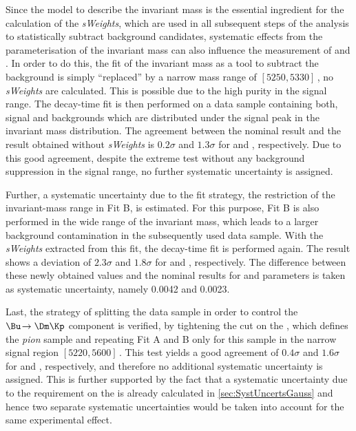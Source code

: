 Since the model to describe the invariant mass is the essential ingredient for the calculation of the \emph{sWeights}, which are used in all subsequent steps of the analysis to statistically subtract background candidates, systematic effects from the parameterisation of the invariant mass can also influence the measurement of \Sf and \Sfbar.
In order to do this, the fit of the invariant mass as a tool to subtract the background is simply \enquote{replaced} by a narrow mass range of $[5250,5330]\,$\si[per-mode=symbol]{\MeVcc}, \ie no \emph{sWeights} are calculated.
This is possible due to the high purity in the signal range.
The decay-time fit is then performed on a data sample containing both, signal and backgrounds which are distributed under the signal peak in the invariant mass distribution.
The agreement between the nominal result and the result obtained without \emph{sWeights} is $0.2\sigma$ and $1.3\sigma$ for \Sf and \Sfbar, respectively.
Due to this good agreement, despite the extreme test without any background suppression in the signal range, no further systematic uncertainty is assigned.

Further, a systematic uncertainty due to the fit strategy, \ie the restriction of the invariant-mass range in Fit B, is estimated.
For this purpose, Fit B is also performed in the wide range of the invariant mass, which leads to a larger background contamination in the subsequently used data sample.
With the \emph{sWeights} extracted from this fit, the decay-time fit is performed again.
The result shows a deviation of $2.3\sigma$ and $1.8\sigma$ for \Sf and \Sfbar, respectively.
The difference between these newly obtained values and the nominal results for \Sf and \Sfbar parameters is taken as systematic uncertainty, namely \num{0.0042} and \num{0.0023}.

Last, the strategy of splitting the data sample in order to control the $\Bu\!\to\Dm\Kp$ component is verified, by tightening the cut on the \dllkpi, which defines the \emph{pion} sample and repeating Fit A and B only for this sample in the narrow signal region $[5220, 5600]\,$\si[per-mode=symbol]{\MeVcc}.
This test yields a good agreement of $0.4\sigma$ and $1.6\sigma$ for \Sf and \Sfbar, respectively, and therefore no additional systematic uncertainty is assigned.
This is further supported by the fact that a systematic uncertainty due to the requirement on the \dllkpi is already calculated in \cref{sec:SystUncertsGauss} and hence two separate systematic uncertainties would be taken into account for the same experimental effect.

